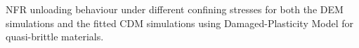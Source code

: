 \label{fig:unload2} NFR unloading behaviour under different confining stresses for both the DEM simulations and the fitted CDM simulations using Damaged-Plasticity Model for quasi-brittle materials.